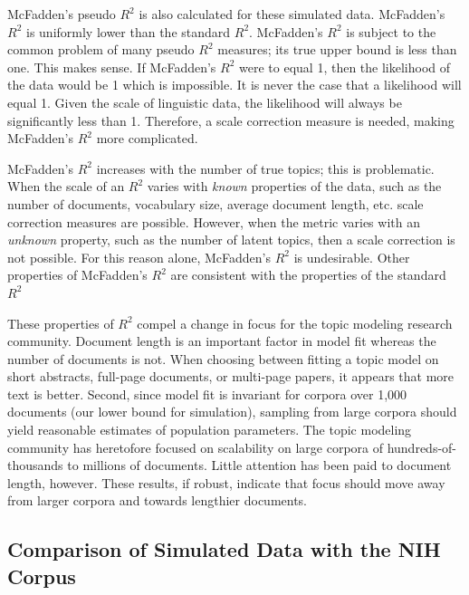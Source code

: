\documentclass[conference,final,]{IEEEtran}
\begin{document}
McFadden's pseudo \(R^2\) is also calculated for these simulated data.
McFadden's \(R^2\) is uniformly lower than the standard \(R^2\).
McFadden's \(R^2\) is subject to the common problem of many pseudo
\(R^2\) measures; its true upper bound is less than one. This makes
sense. If McFadden's \(R^2\) were to equal 1, then the likelihood of the
data would be 1 which is impossible. It is never the case that a
likelihood will equal 1. Given the scale of linguistic data, the
likelihood will always be significantly less than 1. Therefore, a scale
correction measure is needed, making McFadden's \(R^2\) more
complicated.

McFadden's \(R^2\) increases with the number of true topics; this is
problematic. When the scale of an \(R^2\) varies with \textit{known}
properties of the data, such as the number of documents, vocabulary
size, average document length, etc. scale correction measures are
possible. However, when the metric varies with an \textit{unknown}
property, such as the number of latent topics, then a scale correction
is not possible. For this reason alone, McFadden's \(R^2\) is
undesirable. Other properties of McFadden's \(R^2\) are consistent with
the properties of the standard \(R^2\)

These properties of \(R^2\) compel a change in focus for the topic
modeling research community. Document length is an important factor in
model fit whereas the number of documents is not. When choosing between
fitting a topic model on short abstracts, full-page documents, or
multi-page papers, it appears that more text is better. Second, since
model fit is invariant for corpora over 1,000 documents (our lower bound
for simulation), sampling from large corpora should yield reasonable
estimates of population parameters. The topic modeling community has
heretofore focused on scalability on large corpora of
hundreds-of-thousands to millions of documents. Little attention has
been paid to document length, however. These results, if robust,
indicate that focus should move away from larger corpora and towards
lengthier documents.

\subsection{Comparison of Simulated Data with the NIH Corpus}
\end{document}
